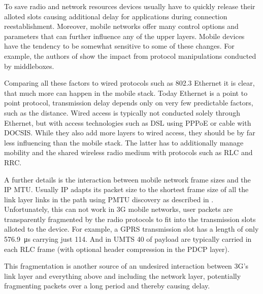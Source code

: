 To save radio and network resources devices usually have to quickly release their alloted slots causing additional delay for applications during connection reestablishment. Moreover, mobile networks offer many control options and parameters that can further influence any of the upper layers. Mobile devices have the tendency to be somewhat sensitive to some of these changes. For example, the authors of \cite{sigcomm11middleboxes} show the impact from protocol manipulations conducted by middleboxes. 

Comparing all these factors to wired protocols such as 802.3 Ethernet it is clear, that much more can happen in the mobile stack. Today Ethernet is a point to point protocol, transmission delay depends only on very few predictable factors, such as the distance. Wired access is typically not conducted solely through Ethernet, but with access technologies such as \gls{DSL} using \gls{PPPoE} or cable with \gls{DOCSIS}. While they also add more layers to wired access, they should be by far less influencing than the mobile stack. The latter has to additionally manage mobility and the shared wireless radio medium with protocols such as \gls{RLC} and \gls{RRC}.

A further details is the interaction between mobile network frame sizes and the \gls{IP} \gls{MTU}. Usually \gls{IP} adapts its packet size to the shortest frame size of all the link layer links in the path using \gls{PMTU} discovery as described in \cite{rfc1191}. Unfortunately, this can not work in \gls{3G} mobile networks, user packets are transparently fragmented by the radio protocols to fit into the transmission slots alloted to the device. For example, a \gls{GPRS} transmission slot has a length of only \SI{576.9}{\micro\second} carrying just \SI{114}{\bit}. And in \gls{UMTS} \SI{40}{\byte} of payload are typically carried in each \gls{RLC} frame (with optional header compression in the \gls{PDCP} layer).


This fragmentation is another source of an undesired interaction between \gls{3G}'s link layer and everything above and including the network layer, potentially fragmenting packets over a long period and thereby causing delay.

